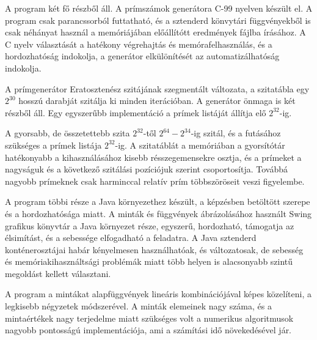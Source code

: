 \documentclass[12pt]{report}
\begin{document}
A program két fő részből áll.
A prímszámok generátora C-99 nyelven készült el.  %
A program csak parancssorból futtatható, és a sztenderd könvytári függvényekből
is csak néhányat használ a memóriájában előállítótt eredmények fájlba írásához.
A C nyelv választását a hatékony végrehajtás és memórafelhasználás, és
a hordozhatóság indokolja, a generátor elkülönítését az automatizálhatóság indokolja.

A prímgenerátor Eratosztenész szitájának szegmentált változata,
a szitatábla egy $2^{30}$ hosszú darabját szitálja ki minden iterációban.
A generátor önmaga is két részből áll.
Egy egyszerűbb implementáció a prímek listáját állítja elő $2^{32}$-ig.

A gyorsabb, de összetettebb szita $2^{32}$-től $2^{64}-2^{34}$-ig szitál,
és a futásához szükséges a prímek listája $2^{32}$-ig.
A szitatáblát a memóriában a gyorsítótár hatékonyabb a kihasználásához kisebb
résszegemensekre osztja,
és a prímeket a nagyságuk és a következő szitálási pozíciójuk szerint csoportosítja.
Továbbá nagyobb prímeknek csak harminccal relatív prím többszöröseit veszi figyelembe.

A program többi része a Java környezethez készült, a képzésben betöltött szerepe és
a hordozhatósága miatt.  %
A minták és függvények ábrázolásához használt Swing grafikus könyvtár
a Java környezet része, egyszerű, hordozható, támogatja az élsimítást,
és a sebessége elfogadható a feladatra.
A Java sztenderd konténerosztájai habár kényelmesen használhatóak, és változatosak,
de sebesség és memóriakihasználtsági problémák miatt több helyen is alacsonyabb szintű
megoldást kellett választani.  %

A program a mintákat alapfüggvények lineáris kombinációjával képes közelíteni,
a legkisebb négyzetek módszerével. A minták elemeinek nagy száma, és a mintaértékek
nagy terjedelme miatt szükséges volt a numerikus algoritmusok nagyobb pontosságú
implementációja, ami a számítási idő növekedésével jár.
\end{document}
